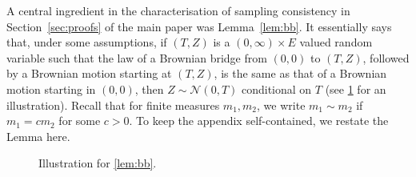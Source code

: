 \documentclass[reqno,draft]{amsart}
\numberwithin{equation}{section}
\theoremstyle{plain}
\newtheorem{lemma}[theorem]{Lemma}
\theoremstyle{remark}
\newcommand*\diff{\mathop{}\!\mathrm{d}}
\def\sig{0.1}
\begin{document}
A central ingredient in the characterisation of sampling consistency in Section~\ref{sec:proofs} of the main paper was Lemma~\ref{lem:bb}. It essentially says that, under some assumptions, if $(T,Z)$ is a $(0,\infty)\times E$ valued random variable such that the law of a Brownian bridge from $(0,0)$ to $(T,Z)$, followed by a Brownian motion starting at $(T,Z)$, is the same as that of a Brownian motion starting in $(0,0)$, then $Z \sim \mathcal{N}(0,T)$ conditional on $T$ (see \cref{fig:lem:bb} for an illustration).
Recall that for finite measures $m_1,m_2$, we write $m_1 \sim m_2$ if $m_1 = c m_2$ for some $c > 0$. To keep the appendix self-contained, we restate the Lemma here.
\lembb*
\begin{figure}
    \begin{center}
    \end{center}
    \caption{Illustration for \cref{lem:bb}.}
    \label{fig:lem:bb}
\end{figure}
\end{document}
